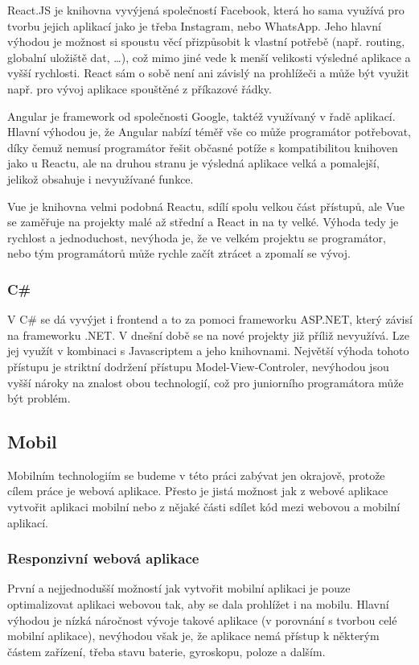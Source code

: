 React.JS je knihovna vyvýjená společností Facebook, která ho sama využívá pro tvorbu jejich aplikací jako je třeba Instagram, nebo WhatsApp. Jeho hlavní výhodou je možnost si spoustu věcí přizpůsobit k vlastní potřebě (např. routing, globalní uložiště dat, \ldots{}), což mimo jiné vede k menší velikosti výsledné aplikace a vyšší rychlosti. React sám o sobě není ani závislý na prohlížeči a může být využit např. pro vývoj aplikace spouštěné z příkazové řádky.

Angular je framework od společnosti Google, taktéž využívaný v řadě aplikací. Hlavní výhodou je, že Angular nabízí téměř vše co může programátor potřebovat, díky čemuž nemusí programátor řešit občasné potíže s kompatibilitou knihoven jako u Reactu, ale na druhou stranu je výsledná aplikace velká a pomalejší, jelikož obsahuje i nevyužívané funkce.

Vue je knihovna velmi podobná Reactu, sdílí spolu velkou část přístupů, ale Vue se zaměřuje na projekty malé až střední a React in na ty velké. Výhoda tedy je rychlost a jednoduchost, nevýhoda je, že ve velkém projektu se programátor, nebo tým programátorů může rychle začít ztrácet a zpomalí se vývoj.

\subsubsection*{C\# }
V C\# se dá vyvýjet i frontend a to za pomoci frameworku ASP.NET, který závisí na frameworku .NET. V dnešní době se na nové projekty již příliž nevyužívá. Lze jej využít v kombinaci s Javascriptem a jeho knihovnami. Největší výhoda tohoto přístupu je striktní dodržení přístupu Model-View-Controler, nevýhodou jsou vyšší nároky na znalost obou technologií, což pro juniorního programátora může být problém.

\subsection{Mobil}
\label{ss:mobile}
Mobilním technologiím se budeme v této práci zabývat jen okrajově, protože cílem práce je webová aplikace. Přesto je jistá možnost jak z webové aplikace vytvořit aplikaci mobilní nebo z nějaké části sdílet kód mezi webovou a mobilní aplikací.

\subsubsection*{Responzivní webová aplikace}
\label{sss:responsive_web_app}
První a nejjednodušší možností jak vytvořit mobilní aplikaci je pouze optimalizovat aplikaci webovou tak, aby se dala prohlížet i na mobilu. Hlavní výhodou je nízká náročnost vývoje takové aplikace (v porovnání s tvorbou celé mobilní aplikace), nevýhodou však je, že aplikace nemá přístup k některým částem zařízení, třeba stavu baterie, gyroskopu, poloze a dalším.

